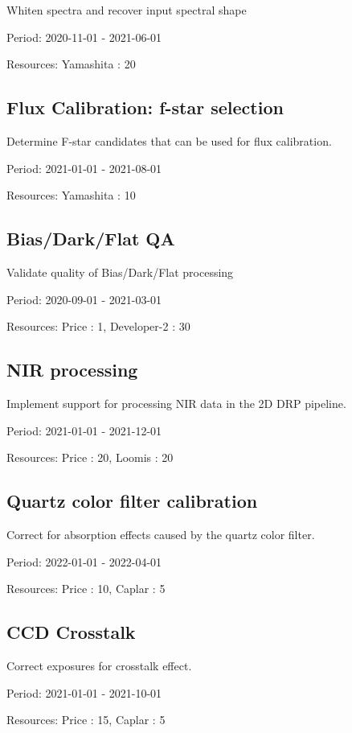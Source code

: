 Whiten spectra and recover input spectral shape

Period: 2020-11-01 - 2021-06-01

Resources: Yamashita : 20

\subsection{Flux Calibration: f-star selection}

Determine F-star candidates that can be used for flux calibration.

Period: 2021-01-01 - 2021-08-01

Resources: Yamashita : 10

\subsection{Bias/Dark/Flat QA}

Validate quality of Bias/Dark/Flat processing

Period: 2020-09-01 - 2021-03-01

Resources: Price : 1, Developer-2 : 30

\subsection{NIR processing}

Implement support for processing NIR data in the 2D DRP pipeline.

Period: 2021-01-01 - 2021-12-01

Resources: Price : 20, Loomis : 20

\subsection{Quartz color filter calibration}

Correct for absorption effects caused by the quartz color filter.

Period: 2022-01-01 - 2022-04-01

Resources: Price : 10, Caplar : 5

\subsection{CCD Crosstalk}

Correct exposures for crosstalk effect.

Period: 2021-01-01 - 2021-10-01

Resources: Price : 15, Caplar : 5

